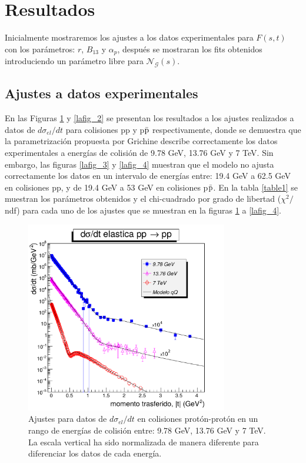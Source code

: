 \section{Resultados}
Inicialmente mostraremos los ajustes a los datos experimentales para $F(s,t)$ con los parámetros: $r$, $B_{13}$ y $\alpha_p$, después se mostraran los fits obtenidos introduciendo un parámetro libre para $\mathcal{N_G}(s)$.
\subsection{Ajustes a datos experimentales } 
En las Figuras \ref{lafig_1} y \ref{lafig_2} se presentan los resultados a
los ajustes realizados a datos de $d\sigma_{el}/dt$ para colisiones pp y p$\bar{\textup{p}}$ respectivamente, donde se demuestra que la parametrización propuesta por Grichine describe correctamente los datos experimentales a energ\'ias de colisión de 9.78 GeV, 13.76 GeV y 7 TeV. Sin embargo, las figuras \ref{lafig_3} y \ref{lafig_4} muestran que el modelo no ajusta correctamente los datos en un intervalo de energías entre: 19.4 GeV a 62.5 GeV en colisiones pp, y de 19.4 GeV a 53 GeV en colisiones p$\bar{\textup{p}}$. En la tabla \ref{table1} se muestran los parámetros obtenidos y el chi-cuadrado por grado de libertad ($\chi^2/$ndf) para cada uno de los ajustes que se muestran en la figuras \ref{lafig_1} a \ref{lafig_4}. 
\begin{figure}[H]\centering
\includegraphics[width=8.8cm]{graficas/unnamedp.pdf}
\caption{\mismall Ajustes para datos de $d\sigma_{el}/dt$ en colisiones prot\'on-prot\'on en un rango de energías de colisión entre: 9.78 GeV, 13.76 GeV y 7 TeV. La escala vertical ha sido normalizada de manera diferente para diferenciar los datos de cada energía.}
\label{lafig_1}
\end{figure}
